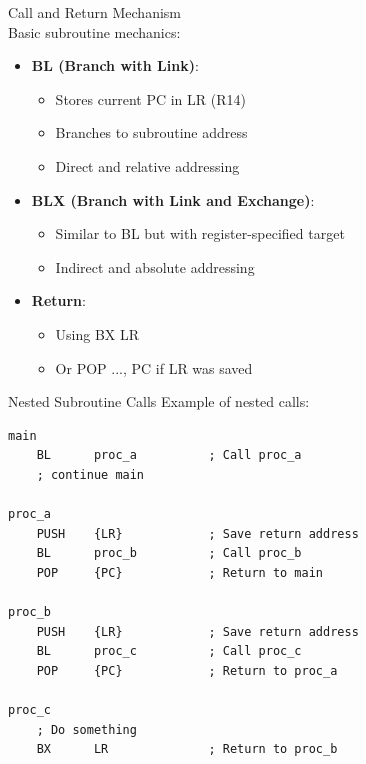\begin{concept}{Call and Return Mechanism}\\
Basic subroutine mechanics:
\begin{itemize}
  \item \textbf{BL (Branch with Link)}:
    \begin{itemize}
      \item Stores current PC in LR (R14)
      \item Branches to subroutine address
      \item Direct and relative addressing
    \end{itemize}
  \item \textbf{BLX (Branch with Link and Exchange)}:
    \begin{itemize}
      \item Similar to BL but with register-specified target
      \item Indirect and absolute addressing
    \end{itemize}
  \item \textbf{Return}:
    \begin{itemize}
      \item Using BX LR
      \item Or POP {..., PC} if LR was saved
    \end{itemize}
\end{itemize}
\end{concept}

\begin{example2}{Nested Subroutine Calls}
Example of nested calls:
\begin{lstlisting}[language=armasm, style=basesmol]
main
    BL      proc_a          ; Call proc_a
    ; continue main
    
proc_a
    PUSH    {LR}            ; Save return address
    BL      proc_b          ; Call proc_b
    POP     {PC}            ; Return to main
    
proc_b
    PUSH    {LR}            ; Save return address
    BL      proc_c          ; Call proc_c
    POP     {PC}            ; Return to proc_a
    
proc_c
    ; Do something
    BX      LR              ; Return to proc_b
\end{lstlisting}
\end{example2}


